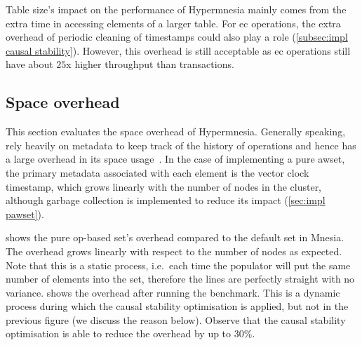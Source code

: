 Table size's impact on the performance of Hypermnesia mainly comes from the
extra time in accessing elements of a larger table. For \acrshort{ec} operations,
the extra overhead of periodic cleaning of timestamps could also play a 
role (\cref{subsec:impl causal stability}). However, this overhead 
is still acceptable as \acrshort{ec}
operations still have about \(25\)x higher throughput than transactions.

\subsection{Space overhead} \label{sec:eval space}

This section evaluates the space overhead of Hypermnesia. Generally speaking,
 rely heavily on metadata to keep track of the history of
operations and hence has a large overhead in its space usage~\cite{bauwens2019crdtmemory}. 
In the case of implementing a pure \acrshort{awset}, the primary
metadata associated with each element is the vector clock timestamp, which
grows linearly with the number of nodes in the cluster, although
garbage collection is implemented to reduce its impact (\cref{sec:impl pawset}).

 shows the pure op-based set's overhead
compared to the default set in Mnesia. The overhead grows linearly with respect
to the number of nodes as expected. Note that this is a static process, i.e.\ each
time the populator will put the same number of elements into the set, therefore
the lines are perfectly straight with no variance.
 shows the
overhead after running the benchmark. This is a dynamic process during which
the causal stability optimisation is applied, but not in the previous
figure (we discuss the reason below). Observe that the causal stability optimisation
is able to reduce the overhead by up to \(30\%\).

